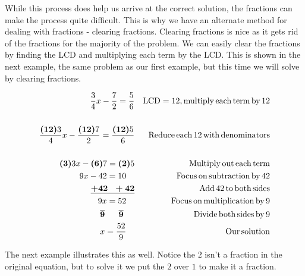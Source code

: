  While this process does help us arrive at the correct solution, the fractions
can make the process quite difficult. This is why we have an alternate method
for dealing with fractions - clearing fractions. Clearing fractions is nice as
it gets rid of the fractions for the majority of the problem. We can easily
clear the fractions by finding the LCD and multiplying each term by the LCD.
This is shown in the next example, the same problem as our first example, but
this time we will solve by clearing fractions.

\begin{example}\label{Lin30}
  \begin{eqnarray*}
    \frac{3}{4} x - \frac{7}{2} = \frac{5}{6} &  & \operatorname{LCD} = 12,
    \operatorname{multiply} \operatorname{each} \operatorname{term} \operatorname{by} 12\\
    &  & \\
    \frac{\boldsymbol{(12)} 3}{4} x - \frac{\boldsymbol{(12)} 7}{2} =
    \frac{\boldsymbol{(12)} 5}{6} &  & \operatorname{Reduce} \operatorname{each} 12 \operatorname{with}
    \operatorname{denominators}\\
    &  & \\
    \boldsymbol{(3)} 3 x - \boldsymbol{(6)} 7 = \boldsymbol{(2)} 5 &  &
    \operatorname{Multiply} \operatorname{out} \operatorname{each} \operatorname{term}\\
    9 x - 42 = 10~~~ &  & \operatorname{Focus} \operatorname{on} \operatorname{subtraction} \operatorname{by}
    42\\
    \boldsymbol{\underline{+ 42 ~~+ 42}} &  & \operatorname{Add} 42 \operatorname{to} \operatorname{both}
    \operatorname{sides}\\
    9 x = 52~~~ &  & \operatorname{Focus} \operatorname{on} \operatorname{multiplication} \operatorname{by} 9\\
    \boldsymbol{\overline{9} ~~~~~ \overline{9}}~~~~ &  & \operatorname{Divide} \operatorname{both}
    \operatorname{sides} \operatorname{by} 9\\
    x = \frac{52}{9}~~~ &  & \operatorname{Our} \operatorname{solution}
  \end{eqnarray*}
\end{example}

 The next example illustrates this as well. Notice the $2$ isn't a fraction in
the original equation, but to solve it we put the $2$ over $1$ to make it a
fraction.

